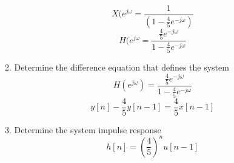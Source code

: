 \documentclass{article}
\begin{document}
\begin{enumerate}
\begin{enumerate}
\begin{equation}
            X(e^{j\omega} = \frac{1}{(1-\frac{4}{5}e^{-j\omega})}
        \end{equation}
        \begin{equation}
            H(e^{j\omega} = \frac{\frac{4}{5}e^{-j\omega}}{1-\frac{4}{5}e^{-j\omega}}
        \end{equation}
        \item Determine the difference equation that defines the system
        \begin{equation}
            H(e^{j\omega}) = \frac{\frac{4}{5}e^{-j\omega}}{1-\frac{4}{5}e^{-j\omega}}
        \end{equation}
        \begin{equation}
            y[n] - \frac{4}{5}y[n-1] = \frac{4}{5}x[n-1]
        \end{equation}
        \item Determine the system impulse response
        \begin{equation}
            h[n] = \left(\frac{4}{5}\right)^nu[n-1]
        \end{equation}
    \end{enumerate}
\end{enumerate}
\end{document}
